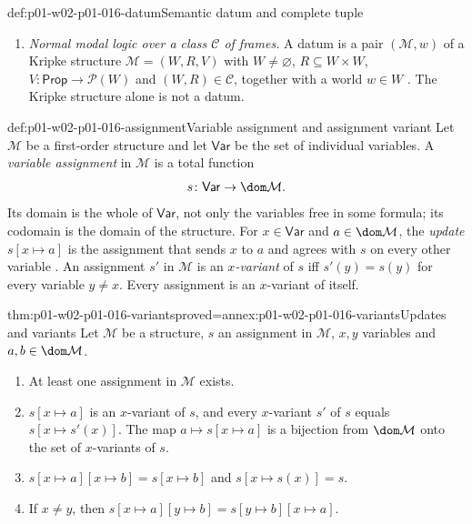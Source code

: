 \begin{hbdefinition}{def:p01-w02-p01-016-datum}{Semantic datum and complete tuple}
\begin{enumerate}
  \item \emph{Normal modal logic over a class \(\mathcal C\) of frames.} A
        datum is a pair \((\mathcal M,w)\) of a Kripke structure
        \(\mathcal M=(W,R,V)\) with \(W\ne\varnothing\),
        \(R\subseteq W\times W\), \(V\colon\mathsf{Prop}\to\mathcal P(W)\)
        and \((W,R)\in\mathcal C\), together with a world \(w\in W\)
        \cite[ch.~``Modal, Temporal, and Epistemic Logic'', definition
        ``Kripke frame and Kripke structure'']{FrozenFormalLogicSemanticData}.
        The Kripke structure alone is not a datum.
\end{enumerate}
\end{hbdefinition}

\begin{hbdefinition}{def:p01-w02-p01-016-assignment}{Variable assignment and assignment variant}
Let \(\mathcal M\) be a first-order structure and let \(\mathsf{Var}\) be the
set of individual variables. A \emph{variable assignment} in \(\mathcal M\) is
a total function
\[
  s\colon\mathsf{Var}\to\dom\mathcal M .
\]
Its domain is the whole of \(\mathsf{Var}\), not only the variables free in
some formula; its codomain is the domain of the structure. For
\(x\in\mathsf{Var}\) and \(a\in\dom\mathcal M\), the \emph{update}
\(s[x\mapsto a]\) is the assignment that sends \(x\) to \(a\) and agrees with
\(s\) on every other variable
\cite[ch.~``Structures, Satisfaction, and Translation'', definition
``Variable assignment and update'']{FrozenFormalLogicSemanticData}. An
assignment \(s'\) in \(\mathcal M\) is an \emph{\(x\)-variant} of \(s\) iff
\(s'(y)=s(y)\) for every variable \(y\ne x\). Every assignment is an
\(x\)-variant of itself.
\end{hbdefinition}

\begin{hblemma}{thm:p01-w02-p01-016-variants}{proved=annex:p01-w02-p01-016-variants}{Updates and variants}
Let \(\mathcal M\) be a structure, \(s\) an assignment in \(\mathcal M\),
\(x,y\) variables and \(a,b\in\dom\mathcal M\).
\begin{enumerate}
  \item At least one assignment in \(\mathcal M\) exists.
  \item \(s[x\mapsto a]\) is an \(x\)-variant of \(s\), and every
        \(x\)-variant \(s'\) of \(s\) equals \(s[x\mapsto s'(x)]\). The map
        \(a\mapsto s[x\mapsto a]\) is a bijection from \(\dom\mathcal M\) onto
        the set of \(x\)-variants of \(s\).
  \item \(s[x\mapsto a][x\mapsto b]=s[x\mapsto b]\) and
        \(s[x\mapsto s(x)]=s\).
  \item If \(x\ne y\), then
        \(s[x\mapsto a][y\mapsto b]=s[y\mapsto b][x\mapsto a]\).
\end{enumerate}
\end{hblemma}

